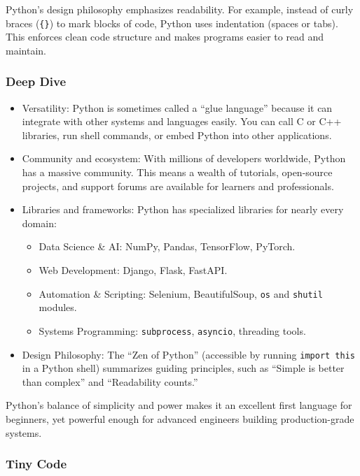 \documentclass[
  letterpaper,
  DIV=11,
  numbers=noendperiod]{scrreprt}
\providecommand{\tightlist}{%
  \setlength{\itemsep}{0pt}\setlength{\parskip}{0pt}}
\begin{document}
Python's design philosophy emphasizes readability. For example, instead
of curly braces (\texttt{\{\}}) to mark blocks of code, Python uses
indentation (spaces or tabs). This enforces clean code structure and
makes programs easier to read and maintain.

\subsubsection{Deep Dive}\label{deep-dive}

\begin{itemize}
\item
  Versatility: Python is sometimes called a ``glue language'' because it
  can integrate with other systems and languages easily. You can call C
  or C++ libraries, run shell commands, or embed Python into other
  applications.
\item
  Community and ecosystem: With millions of developers worldwide, Python
  has a massive community. This means a wealth of tutorials, open-source
  projects, and support forums are available for learners and
  professionals.
\item
  Libraries and frameworks: Python has specialized libraries for nearly
  every domain:

  \begin{itemize}
  \tightlist
  \item
    Data Science \& AI: NumPy, Pandas, TensorFlow, PyTorch.
  \item
    Web Development: Django, Flask, FastAPI.
  \item
    Automation \& Scripting: Selenium, BeautifulSoup, \texttt{os} and
    \texttt{shutil} modules.
  \item
    Systems Programming: \texttt{subprocess}, \texttt{asyncio},
    threading tools.
  \end{itemize}
\item
  Design Philosophy: The ``Zen of Python'' (accessible by running
  \texttt{import\ this} in a Python shell) summarizes guiding
  principles, such as ``Simple is better than complex'' and
  ``Readability counts.''
\end{itemize}

Python's balance of simplicity and power makes it an excellent first
language for beginners, yet powerful enough for advanced engineers
building production-grade systems.

\subsubsection{Tiny Code}\label{tiny-code}
\end{document}
